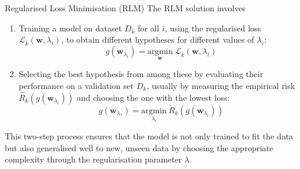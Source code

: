 \begin{definitionbox}{Regularised Loss Minimisation (RLM)}
The RLM solution involves
\begin{enumerate}
    \item Training a model on dataset \( D_{\bar{k}} \) for all \( i \), using the regularised loss \( \mathcal{L}_{\bar{k}}(\mathbf{w}, \lambda_i) \), to obtain different hypotheses for different values of \( \lambda_i \):
    \[
    g(\mathbf{w}_{\lambda_i}) = \underset{\mathbf{w}}{\mathrm{argmin}}\ \mathcal{L}_{\bar{k}}(\mathbf{w}, \lambda_i)
    \]
    
    \item Selecting the best hypothesis from among these by evaluating their performance on a validation set \( D_k \), usually by measuring the empirical risk \( \hat{R}_k(g(\mathbf{w}_{\lambda_i})) \) and choosing the one with the lowest loss:
    \[
    g(\mathbf{w}_{\lambda_*}) = \underset{\lambda_i}{\mathrm{argmin}}\ \check{R}_k(g(\mathbf{w}_{\lambda_i}))
    \]
\end{enumerate}

This two-step process ensures that the model is not only trained to fit the data but also generalised well to new, unseen data by choosing the appropriate complexity through the regularisation parameter \( \lambda \). 
    
\end{definitionbox}